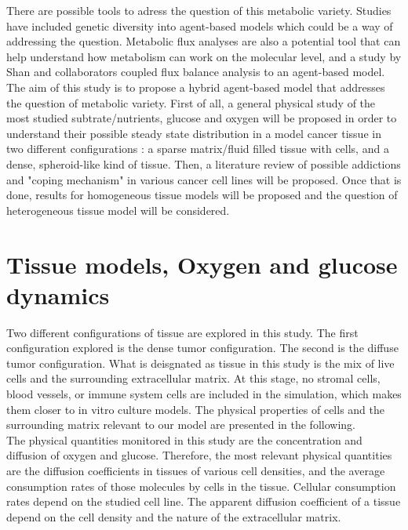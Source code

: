 \documentclass[11pt,a4paper]{article}
\begin{document}
There are possible tools to adress the question of this metabolic variety. Studies have included genetic diversity into agent-based models which could be a way of addressing the question.\cite{Sun2017}\cite{Sottoriva2010}\cite{Enderling2009}\cite{Iwasaki2021} Metabolic flux analyses are also a potential tool that can help understand how metabolism can work on the molecular level,\cite{Damiani2017} and a study by Shan and collaborators coupled flux balance analysis to an agent-based model.\cite{Shan2018}\\

The aim of this study is to propose a hybrid agent-based model that addresses the question of metabolic variety. First of all, a general physical study of the most studied subtrate/nutrients, glucose and oxygen will be proposed in order to understand their possible steady state distribution in a model cancer tissue in two different configurations : a sparse matrix/fluid filled tissue with cells, and a dense, spheroid-like kind of tissue. Then, a literature review of possible addictions and "coping mechanism" in various cancer cell lines will be proposed. Once that is done, results for homogeneous tissue models will be proposed and the question of heterogeneous tissue model will be considered.\\

\section{Tissue models, Oxygen and glucose dynamics}
Two different configurations of tissue are explored in this study. The first configuration explored is the dense tumor configuration. The second is the diffuse tumor configuration. What is deisgnated as tissue in this study is the mix of live cells and the surrounding extracellular matrix. At this stage, no stromal cells, blood vessels, or immune system cells are included in the simulation, which makes them closer to in vitro culture models. The physical properties of cells and the surrounding matrix relevant to our model are presented in the following.\\

The physical quantities monitored in this study are the concentration and diffusion of oxygen and glucose. Therefore, the most relevant physical quantities are the diffusion coefficients in tissues of various cell densities, and the average consumption rates of those molecules by cells in the tissue. Cellular consumption rates depend on the studied cell line. The apparent diffusion coefficient of a tissue depend on the cell density and the nature of the extracellular matrix.\\
\end{document}
